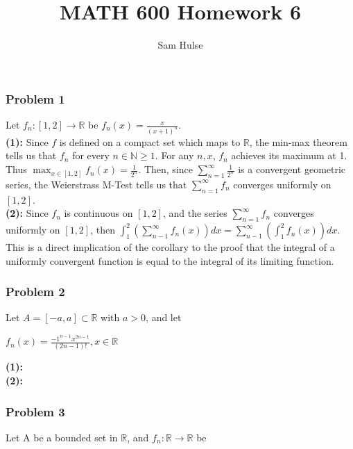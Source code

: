 \documentclass{article}
\title{MATH 600 Homework 6}
\author{Sam Hulse}
\newcommand{\N}{\mathbb{N}}
\newcommand{\R}{\mathbb{R}}
\begin{document}
\maketitle

\subsubsection*{Problem 1}
Let $f_n : [1, 2] \rightarrow \R$ be $f_n(x) = \frac{x}{(x+1)^n}$.\\

\noindent \textbf{(1):} Since $f$ is defined on a compact set which maps to $\R$, the min-max theorem tells us that $f_n$ for every $n \in \N \geq 1$. For any $n, x$, $f_n$ achieves its maximum at 1. Thus $\max_{x \in [1, 2]} f_n(x) = \frac{1}{2^n}$. Then, since $\sum_{n = 1}^\infty \frac{1}{2^n}$ is a convergent geometric series, the Weierstrass M-Test tells us that $\sum_{n = 1}^\infty f_n$ converges uniformly on $[1, 2]$. \\

\noindent \textbf{(2):} Since $f_n$ is continuous on $[1, 2]$, and the series $\sum_{n = 1}^\infty f_n$ converges uniformly on $[1, 2]$, then $\int_1^2 \left(\sum_{n - 1}^\infty f_n(x)\right)dx = \sum_{n - 1}^\infty \left( \int_1^2 f_n(x)\right)dx$. This is a direct implication of the corollary to the proof that the integral of a uniformly convergent function is equal to the integral of its limiting function. \\

\subsubsection*{Problem 2}
Let $A = [-a, a] \subset \R$ with $a > 0$, and let \\

\centerline{$f_n(x) = \frac{{-1}^{n-1}x^{2n-1}}{(2n-1)!}, x \in \R$}

\vspace{1pc}

\noindent \textbf{(1):} \\

\noindent \textbf{(2):} \\

\subsubsection*{Problem 3}
Let A be a bounded set in $\R$,  and $f_n : \R \rightarrow \R$ be \\
\end{document}
